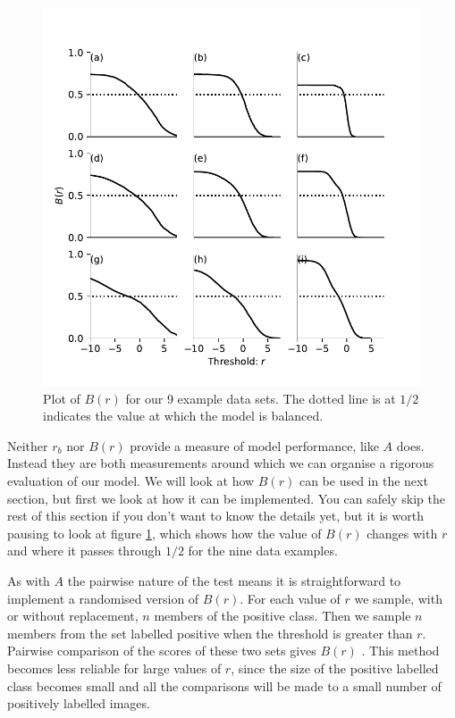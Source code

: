\documentclass{article}
\begin{document}
\begin{figure}[t]
\centering
\includegraphics[scale=1]{Bplot.pdf}
\caption{Plot of $B(r)$ for our 9 example data sets. The dotted line is at $1/2$ indicates the value at which the model is balanced.}
\label{fig:Bplot}
\end{figure}

Neither $r_b$ nor $B(r)$ provide a measure of model performance, like $A$ does. Instead they are both measurements around which we can organise a rigorous evaluation of our model. We will look at how $B(r)$ can be used in the next section, but first we look at how it can be implemented. You can safely skip the rest of this section if you don't want to know the details yet, but it is worth pausing to look at figure \ref{fig:Bplot}, which shows how the value of $B(r)$ changes with $r$ and where it passes through $1/2$ for the nine data examples.

As with $A$ the pairwise nature of the test means it is straightforward to implement a randomised version of $B(r)$. For each value of $r$ we sample, with or without replacement, $n$ members of the positive class. Then we sample $n$ members from the set labelled positive when the threshold is greater than $r$. Pairwise comparison of the scores of these two sets gives $B(r)$ . This method becomes less reliable for large values of $r$, since the size of the positive labelled class becomes small and all the comparisons will be made to a small number of positively labelled images. 
\end{document}
